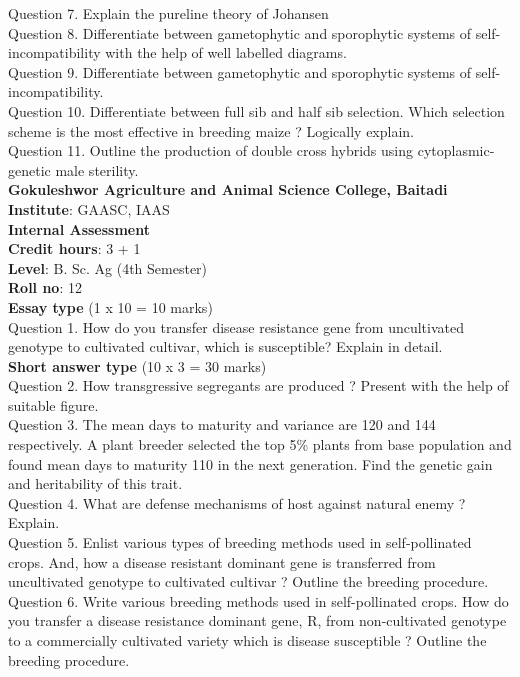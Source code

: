 \documentclass[12pt]{article}\usepackage[]{graphicx}\usepackage[]{color}
\begin{document}
Question 7. Explain the pureline theory of Johansen\\
Question 8. Differentiate between gametophytic and sporophytic systems of self-incompatibility with the help of well labelled diagrams.\\
Question 9. Differentiate between gametophytic and sporophytic systems of self-incompatibility.\\
Question 10. Differentiate between full sib and half sib selection. Which selection scheme is the most effective in breeding maize ? Logically explain.\\
Question 11. Outline the production of double cross hybrids using cytoplasmic-genetic male sterility.\\
\clearpage 
{\centering \Large{\textbf{Gokuleshwor Agriculture and Animal Science College, Baitadi}} \\[0.25cm]
            \textbf{Institute}: GAASC, IAAS \\[0.2cm]
            \textbf{Internal Assessment} \\[0.2cm]} 
\textbf{Credit hours}: 3 + 1 \\ 
\textbf{Level}: B. Sc. Ag (4th Semester) \\
\textbf{Roll no}: 12 \\[0.5cm] 
\textbf{Essay type} (1 x 10 = 10 marks) \\
Question 1. How do you transfer disease resistance gene from uncultivated genotype to cultivated cultivar, which is susceptible? Explain in detail.\\
\textbf{Short answer type} (10 x 3 = 30 marks) \\
Question 2. How transgressive segregants are produced ? Present with the help of suitable figure.\\
Question 3. The mean days to maturity and variance are 120 and 144 respectively. A plant breeder selected the top 5\% plants from base population and found mean days to maturity 110 in the next generation. Find the genetic gain and heritability of this trait.\\
Question 4. What are defense mechanisms of host against natural enemy ? Explain.\\
Question 5. Enlist various types of breeding methods used in self-pollinated crops. And, how a disease resistant dominant gene is transferred from uncultivated genotype to cultivated cultivar ? Outline the breeding procedure.\\
Question 6. Write various breeding methods used in self-pollinated crops. How do you transfer a disease resistance dominant gene, R, from non-cultivated genotype to a commercially cultivated variety which is disease susceptible ? Outline the breeding procedure.\\
\end{document}
